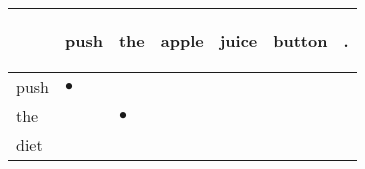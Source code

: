 \documentclass[landscape]{article}
\newcommand{\ssp}{\hspace{2pt}}
\newcommand{\mex}{\cellcolor{g}$\bullet$}
\begin{document}
\newpage

\noindent\begin{tabular}{|l|p{10pt}|p{10pt}|p{10pt}|p{10pt}|p{10pt}|p{10pt}|}
\hline
&\begin{sideways}\cellcolor{ref0}push\hspace{12pt}\end{sideways}&\begin{sideways}\cellcolor{ref1}the\hspace{12pt}\end{sideways}&\begin{sideways}\cellcolor{ref2}apple\hspace{12pt}\end{sideways}&\begin{sideways}\cellcolor{ref3}juice\hspace{12pt}\end{sideways}&\begin{sideways}\cellcolor{ref4}button\hspace{12pt}\end{sideways}&\begin{sideways}\cellcolor{ref5}.\hspace{12pt}\end{sideways}\\
\hline
\ssp \cellcolor{ref0}push \ssp&\hspace{2pt}\mex&\hspace{2pt}&\hspace{2pt}&\hspace{2pt}&\hspace{2pt}&\hspace{2pt}\\
\hline
\ssp \cellcolor{ref1}the \ssp&\hspace{2pt}&\hspace{2pt}\mex&\hspace{2pt}&\hspace{2pt}&\hspace{2pt}&\hspace{2pt}\\
\hline
\ssp diet \ssp&\hspace{2pt}&\hspace{2pt}&\hspace{2pt}&\hspace{2pt}&\hspace{2pt}&\hspace{2pt}\\

\end{tabular}
\end{document}
